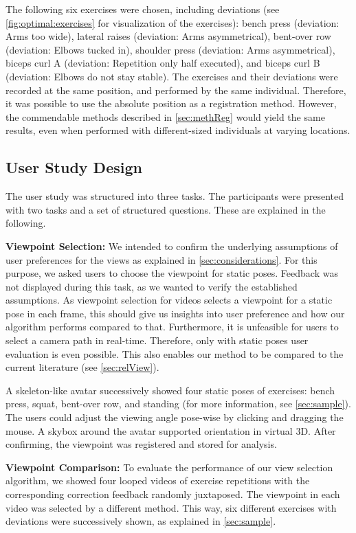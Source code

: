The following six exercises were chosen, including deviations (see \autoref{fig:optimal:exercises} for visualization of the exercises): bench press (deviation: Arms too wide), lateral raises (deviation: Arms asymmetrical), bent-over row (deviation: Elbows tucked in), shoulder press (deviation: Arms asymmetrical), biceps curl A (deviation: Repetition only half executed), and biceps curl B (deviation: Elbows do not stay stable). The exercises and their deviations were recorded at the same position, and performed by the same individual. Therefore, it was possible to use the absolute position as a registration method. However, the commendable methods described in \autoref{sec:methReg} would yield the same results, even when performed with different-sized individuals at varying locations.

\subsection{User Study Design \label{sec:study}}
The user study was structured into three tasks. The participants were presented with two tasks and a set of structured questions. These are explained in the following.

\textbf{Viewpoint Selection:} We intended to confirm the underlying assumptions of user preferences for the views as explained in \autoref{sec:considerations}. For this purpose, we asked users to choose the viewpoint for static poses. Feedback was not displayed during this task, as we wanted to verify the established assumptions. As viewpoint selection for videos selects a viewpoint for a static pose in each frame, this should give us insights into user preference and how our algorithm performs compared to that. Furthermore, it is unfeasible for users to select a camera path in real-time. Therefore, only with static poses user evaluation is even possible. This also enables our method to be compared to the current literature (see \autoref{sec:relView}).

A skeleton-like avatar successively showed four static poses of exercises: bench press, squat, bent-over row, and standing (for more information, see \autoref{sec:sample}). The users could adjust the viewing angle pose-wise by clicking and dragging the mouse. A skybox around the avatar supported orientation in virtual 3D. After confirming, the viewpoint was registered and stored for analysis.

\textbf{Viewpoint Comparison:} To evaluate the performance of our view selection algorithm, we showed four looped videos of exercise repetitions with the corresponding correction feedback randomly juxtaposed. The viewpoint in each video was selected by a different method. This way, six different exercises with deviations were successively shown, as explained in \autoref{sec:sample}.  

